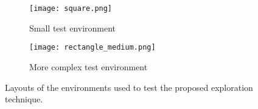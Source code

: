 \begin{figure}[t]
	\centering
	\begin{subfigure}{0.49\textwidth}
	\centering
	\texttt{[image: square.png]}
	\caption{Small test environment\label{fig:square_map}}
	\end{subfigure}
		
	\vspace*{0.1in}
		
	\begin{subfigure}{0.49\textwidth}
	\centering
	\texttt{[image: rectangle\_medium.png]}
	\caption{More complex test environment\label{fig:rectangle_medium_map}}
	\end{subfigure}
	\caption{Layouts of the environments used to test the proposed exploration technique. \label{fig:maps}}
\end{figure}

